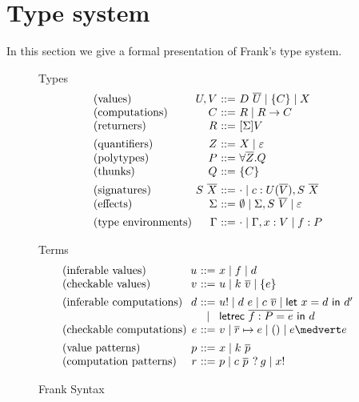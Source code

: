 \documentclass[preprint]{sigplanconf}
\makeatletter
\newcommand{\many}{\overline}
\newcommand\ba{\begin{array}}
\newcommand\ea{\end{array}}
\newenvironment{syntax}{\[\ba{@{}l@{~}r@{~}c@{~}l@{}}}{\ea\]}
\newcommand{\sig}{S}
\newcommand{\sigs}{\Sigma}
\newcommand{\effbox}[1]{[#1]}
\newcommand{\key}[1]{\mathsf{#1}}
\newcommand{\handleSymbol}{\mathbin{?}}
\newcommand{\handle}[2]{{#1} \handleSymbol {#2}}
\newcommand{\thunk}[1]{\{{#1}\}}
\newcommand{\force}[1]{{#1}!}
\newcommand\slab[1]{(\textrm{#1})}
\makeatother
\begin{document}





\section{Type system}
\label{sec:frank}

In this section we give a formal presentation of Frank's type system.
%
\begin{figure}
Types
\begin{syntax}
\slab{values}       &U, V          &::=& D~\many{U} \mid \thunk{C} \mid X \\
\slab{computations} &C             &::=& R \mid R \to C \\
\slab{returners}    &R             &::=& \effbox{\sigs}V
\\[1ex]
\slab{quantifiers}  &Z             &::=& X \mid \varepsilon \\
\slab{polytypes}    &P             &::=& \forall \many{Z}.Q \\
\slab{thunks}       &Q             &::=& \thunk{C}
\\[1ex]
\slab{signatures}   &\sig~\many{X} &::=& \cdot \mid c : U(\many{V}), \sig~\many{X} \\
\slab{effects}      &\sigs  &::=&
  \emptyset \mid \sigs, \sig~\many{V} \mid \varepsilon
\\[1ex]
\slab{type environments}     &\Gamma        &::=& \cdot \mid \Gamma, x:V \mid f:P \\
\end{syntax}

Terms
\begin{syntax}
\slab{inferable values}&u       &::=& x \mid f \mid d                                \\
\slab{checkable values}&v        &::=& u \mid k~\many{v} \mid \thunk{e}
\\[1ex]
\slab{inferable computations}&d &::=& \force{u} \mid d~e \mid c~\many{v}
                               \mid  \key{let}~x=d~\key{in}~d' \\
                             &&\mid& \key{letrec}~\many{f : P = e}~\key{in}~d \\
\slab{checkable computations} &e &::=& v \mid \many{r} \mapsto e \mid () \mid e \medvert e
\\[1ex]
\slab{value patterns}&p       &::=& x \mid k~\many{p}                              \\
\slab{computation patterns}&r &::=& p \mid \handle{c~\many{p}\,}{g} \mid \force{x} \\
\end{syntax}

\caption{Frank Syntax}
\label{fig:frank-syntax}
\end{figure}
\end{document}
